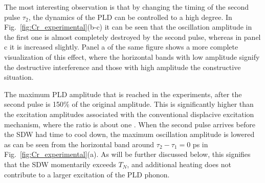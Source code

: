 The most interesting observation is that by changing the timing of the second pulse $\tau_2$, the dynamics of the PLD can be controlled to a high degree.
In Fig.~\ref{fig:Cr_experimental}(b-c) it can be seen that the oscillation amplitude in the first one is almost completely destroyed by the second pulse, whereas in panel c it is increased slightly.
Panel a of the same figure shows a more complete visualization of this effect, where the horizontal bands with low amplitude signify the destructive interference and those with high amplitude the constructive situation.

The maximum PLD amplitude that is reached in the experiments, after the second pulse is 150\% of the original amplitude.
This is significantly higher than the excitation amplitudes associated with the conventional displacive excitation mechanism, where the ratio is about one \cite{Singer2015,Zeiger1992}. 
When the second pulse arrives before the SDW had time to cool down, the maximum oscillation amplitude is lowered as can be seen from the horizontal band around $\tau_2 - \tau_1 = 0$ ps in Fig.~\ref{fig:Cr_experimental}(a).
As will be further discussed below, this signifies that the SDW momentarily exceeds $T_N$, and additional heating does not contribute to a larger excitation of the PLD phonon.

